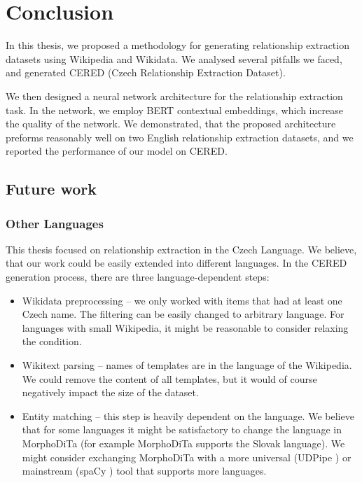 \chapter*{Conclusion}
In this thesis, we proposed a methodology for generating relationship extraction datasets using Wikipedia and Wikidata. We analysed several pitfalls we faced, and generated CERED (Czech Relationship Extraction Dataset). 

We then designed a neural network architecture for the relationship extraction task. In the network, we employ BERT contextual embeddings, which increase the quality of the network. We demonstrated, that the proposed architecture preforms reasonably well on two English relationship extraction datasets, and we reported the performance of our model on CERED.


\section{Future work}

\subsection{Other Languages}

This thesis focused on relationship extraction in the Czech  Language. We believe, that our work could be easily extended into different languages. In the CERED generation process, there are three language-dependent steps:
\begin{itemize}
\item Wikidata preprocessing -- we only worked with items that had at least one Czech name. The filtering can be easily changed to arbitrary language. For languages with small Wikipedia, it might be reasonable to consider relaxing the condition.
\item Wikitext parsing -- names of templates are in the language of the Wikipedia. We could remove the content of all templates, but it would of course negatively impact the size of the dataset.
\item Entity matching -- this step is heavily dependent on the language. We believe that for some languages it might be satisfactory to change the language in MorphoDiTa (for example MorphoDiTa supports the Slovak language). We might consider exchanging MorphoDiTa with a more universal (UDPipe \citep{udpipe:2017}) or mainstream (spaCy \citep{spacy2}) tool that supports more languages.

\end{itemize}


